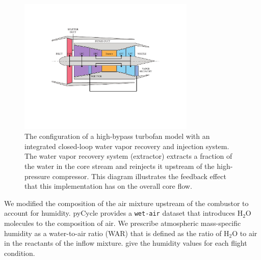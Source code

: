 \documentclass[conf]{new-aiaa}
\begin{document}
\begin{figure}[hbt!]
    \centering
    \includegraphics[width=0.75\textwidth]{turbofan_wvr.pdf}
    \caption{
        The configuration of a high-bypass turbofan model with an integrated closed-loop water vapor recovery and injection system.
        The water vapor recovery system (extractor) extracts a fraction of the water in the core stream and reinjects it upstream of the high-pressure compressor.
        This diagram illustrates the feedback effect that this implementation has on the overall core flow.}
    \label{fig:n3_cycle}
\end{figure}

We modified the composition of the air mixture upstream of the combustor to account for humidity.
pyCycle provides a \texttt{wet-air} dataset that introduces $\mathrm{H_2O}$ molecules to the composition of air.
We prescribe atmospheric mass-specific humidity as a water-to-air ratio (WAR) that is defined as the ratio of $\mathrm{H_2O}$ to air in the reactants of the inflow mixture.
\citet{Kalnay1996} give the humidity values for each flight condition.
\end{document}
